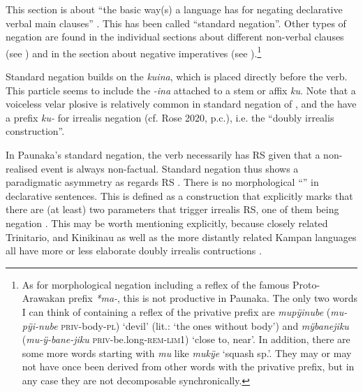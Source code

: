 This section is about “the basic way(s) a language has for negating declarative verbal main clauses” \citep[1]{Miestamo2005}. This has been called “standard negation”. Other types of negation are found in the individual sections about different non-verbal clauses (see ) and in the section about negative imperatives (see ).\footnote{\label{fn:privative} As for morphological negation including a reflex of the famous Proto-Arawakan  prefix \textit{*ma-}, this is not productive in Paunaka. The only two words I can think of containing a reflex of the privative prefix are \textit{mupÿinube} (\textit{mu-pÿi-nube} \textsc{priv}-body-\textsc{pl}) ‘devil’ (lit.: ‘the ones without body’) and \textit{mÿbanejiku} (\textit{mu-ÿ-bane-jiku} \textsc{priv}-be.long-\textsc{rem}-\textsc{lim}1) ‘close to, near’. In addition, there are some more words starting with \textit{mu} like \textit{mukÿe} ‘squash sp.’. They may or may not have once been derived from other words with the privative prefix, but in any case they are not decomposable synchronically.}

Standard negation builds on the  \textit{kuina}, which is placed directly before the verb. This particle seems to include the  \textit{-ina} attached to a stem or affix \textit{ku}. Note that a voiceless velar plosive is relatively common in standard negation of  \citep[288]{Michael2014b}, and the  have a prefix \textit{ku-} for irrealis negation (cf. Rose 2020, p.c.), i.e. the “doubly irrealis construction”.

In Paunaka’s standard negation, the verb necessarily has  RS given that a non-realised event is always non-factual. Standard negation thus shows a paradigmatic asymmetry as regards RS \citep[96]{Miestamo2005}. There is no morphological “” in declarative sentences. This is defined as a construction that explicitly marks that there are (at least) two parameters that trigger irrealis RS, one of them being negation \citep[cf.][253]{Michael2014}. This may be worth mentioning explicitly, because closely related Trinitario,  and Kinikinau as well as the more distantly related Kampan languages all have more or less elaborate doubly irrealis contructions \citep[267--269]{Michael2014b}.%


